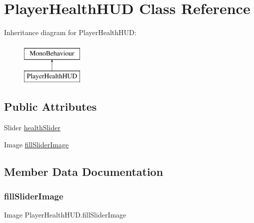 \hypertarget{class_player_health_h_u_d}{}\section{Player\+Health\+H\+UD Class Reference}
\label{class_player_health_h_u_d}
Inheritance diagram for Player\+Health\+H\+UD\+:\begin{figure}[H]
\begin{center}
\leavevmode
\includegraphics[height=2.000000cm]{class_player_health_h_u_d}
\end{center}
\end{figure}
\subsection*{Public Attributes}
\begin{DoxyCompactItemize}
\item 
Slider \mbox{\hyperlink{class_player_health_h_u_d_ac828a52f3323c07569de5d7c27652a00}{health\+Slider}}
\item 
Image \mbox{\hyperlink{class_player_health_h_u_d_a94161d8b19b00334c1eedc212c7ea37a}{fill\+Slider\+Image}}
\end{DoxyCompactItemize}


\subsection{Member Data Documentation}
\mbox{\label{class_player_health_h_u_d_a94161d8b19b00334c1eedc212c7ea37a}} 
\subsubsection{\texorpdfstring{fill\+Slider\+Image}{fillSliderImage}}
{\footnotesize\ttfamily Image Player\+Health\+H\+U\+D.\+fill\+Slider\+Image}

\mbox{\label{class_player_health_h_u_d_ac828a52f3323c07569de5d7c27652a00}} 
